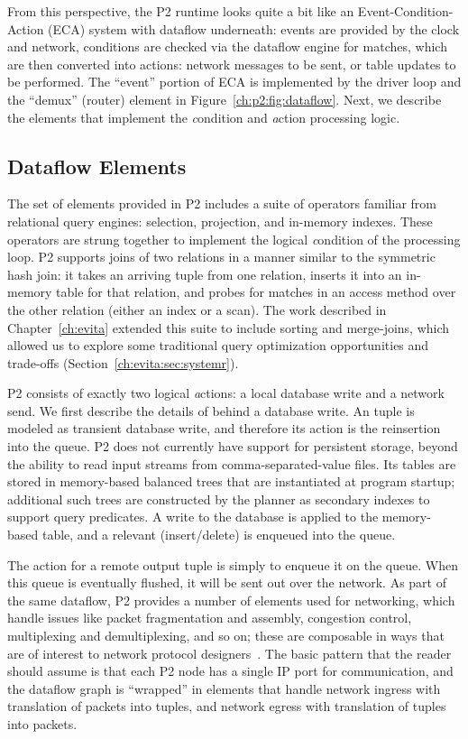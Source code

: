 From this perspective, the P2 runtime looks quite a bit like an
Event-Condition-Action (ECA) system with dataflow underneath: events are
provided by the clock and network, conditions are checked via the dataflow
engine for matches, which are then converted into actions: network messages to
be sent, or table updates to be performed.  The ``event'' portion of ECA is
implemented by the driver loop and the ``demux'' (router) element in
Figure~\ref{ch:p2:fig:dataflow}.  Next, we describe the elements that implement
the {\emph condition} and {\emph action} processing logic.

\subsection{Dataflow Elements} 
\label{ch:p2:sec:dataflow_elements}

The set of elements provided in P2 includes a suite of operators familiar from
relational query engines: selection, projection, and in-memory indexes.  These
operators are strung together to implement the logical {\emph condition} of the 
processing loop.  P2 supports joins of two relations in a manner similar to the
symmetric hash join: it takes an arriving tuple from one relation, inserts it
into an in-memory table for that relation, and probes for matches in an access
method over the other relation (either an index or a scan).  The work described
in Chapter~\ref{ch:evita} extended this suite to include sorting and
merge-joins, which allowed us to explore some traditional query optimization
opportunities and trade-offs (Section~\ref{ch:evita:sec:systemr}).

P2 consists of exactly two logical {\emph actions}: a local database write and
a network send.  We first describe the details of behind a database write.  An
 tuple is modeled as transient database write, and therefore its
action is the reinsertion into the  queue.  P2 does not currently
have support for persistent storage, beyond the ability to read input streams
from comma-separated-value files.  Its tables are stored in memory-based
balanced trees that are instantiated at program startup; additional such trees
are constructed by the planner as secondary indexes to support query
predicates.  A write to the database is applied to the memory-based table, and
a relevant (insert/delete)  is enqueued into the  queue.

The action for a remote output tuple is simply to enqueue it on the  queue.  When this queue is eventually flushed, it will be sent out over
the network.  As part of the same dataflow, P2 provides a number of elements
used for networking, which handle issues like packet fragmentation and
assembly, congestion control, multiplexing and demultiplexing, and so on; these
are composable in ways that are of interest to network protocol
designers~\cite{condie-hotnets05}.  The basic pattern that the reader should
assume is that each P2 node has a single IP port for communication, and the
dataflow graph is ``wrapped'' in elements that handle network ingress with
translation of packets into tuples, and network egress with translation of
tuples into packets.

